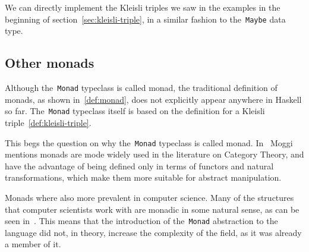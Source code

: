 \documentclass[../TFG.tex]{subfiles}
\begin{document}
We can directly implement the Kleisli triples we saw in the examples in the
beginning of section~\ref{sec:kleisli-triple}, in a similar fashion to
the~\texttt{Maybe} data type.

\subsection{Other monads}
Although the~\texttt{Monad} typeclass is called monad, the
traditional definition of monads, as shown in~\ref{def:monad}, does not
explicitly appear anywhere in Haskell so far. The~\texttt{Monad}
typeclass itself is based on the definition for a Kleisli
triple~\ref{def:kleisli-triple}.

This begs the question on why the~\texttt{Monad} typeclass is
called monad. In~\cite{Moggi-notions-computation-monads} Moggi mentions monads
are mode widely used in the literature on Category Theory, and have the
advantage of being defined only in terms of functors and natural
transformations, which make them more suitable for abstract manipulation.

Monads where also more prevalent in computer science. Many of the structures
that computer scientists work with are monadic in some natural sense, as can be
seen in~\cite{hackage-monad}. This means that the introduction of
the~\texttt{Monad} abstraction to the language did not, in theory,
increase the complexity of the field, as it was already a member of it.
\end{document}

